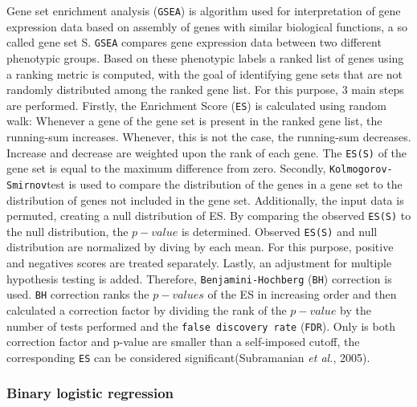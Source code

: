 \documentclass[
  parskip,
  oneside]{\documentclass[oneside]{book}}
\begin{document}
Gene set enrichment analysis (\texttt{GSEA}) is algorithm used for
interpretation of gene expression data based on assembly of genes with
similar biological functions, a so called gene set S. \texttt{GSEA}
compares gene expression data between two different phenotypic groups.
Based on these phenotypic labels a ranked list of genes using a ranking
metric is computed, with the goal of identifying gene sets that are not
randomly distributed among the ranked gene list. For this purpose, 3
main steps are performed. Firstly, the Enrichment Score (\texttt{ES}) is
calculated using random walk: Whenever a gene of the gene set is present
in the ranked gene list, the running-sum increases. Whenever, this is
not the case, the running-sum decreases. Increase and decrease are
weighted upon the rank of each gene. The \texttt{ES(S)} of the gene set
is equal to the maximum difference from zero. Secondly,
\texttt{Kolmogorov-Smirnov}test is used to compare the distribution of
the genes in a gene set to the distribution of genes not included in the
gene set. Additionally, the input data is permuted, creating a null
distribution of ES. By comparing the observed \texttt{ES(S)} to the null
distribution, the \(p-value\) is determined. Observed \texttt{ES(S)} and
null distribution are normalized by diving by each mean. For this
purpose, positive and negatives scores are treated separately. Lastly,
an adjustment for multiple hypothesis testing is added. Therefore,
\texttt{Benjamini-Hochberg} (\texttt{BH}) correction is used.
\texttt{BH} correction ranks the \(p-values\) of the ES in increasing
order and then calculated a correction factor by dividing the rank of
the \(p-value\) by the number of tests performed and the
\texttt{false\ discovery\ rate} (\texttt{FDR}). Only is both correction
factor and p-value are smaller than a self-imposed cutoff, the
corresponding \texttt{ES} can be considered significant(Subramanian
\emph{et al.}, 2005).

\hypertarget{binary-logistic-regression}{%
\subsubsection{Binary logistic
regression}\label{binary-logistic-regression}}
\end{document}
